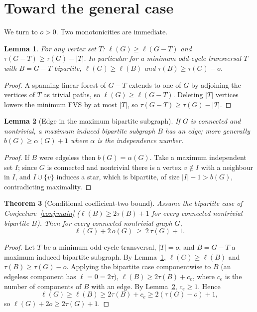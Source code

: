 \documentclass[11pt]{article}
\theoremstyle{plain}
\newtheorem{theorem}{Theorem}[section]
\newtheorem{lemma}[theorem]{Lemma}
\theoremstyle{definition}
\newcommand{\FVS}{\tau}
\newcommand{\OCT}{o}
\newcommand{\lf}{\ell}
\begin{document}
\section{Toward the general case}\label{sec:general}

We turn to $\OCT>0$. Two monotonicities are immediate.

\begin{lemma}\label{lem:mono}
For any vertex set $T$: $\lf(G)\ge\lf(G-T)$ and $\FVS(G-T)\ge\FVS(G)-|T|$. In
particular for a minimum odd-cycle transversal $T$ with $B=G-T$ bipartite,
$\lf(G)\ge\lf(B)$ and $\FVS(B)\ge\FVS(G)-\OCT$.
\end{lemma}

\begin{proof}
A spanning linear forest of $G-T$ extends to one of $G$ by adjoining the vertices
of $T$ as trivial paths, so $\lf(G)\ge\lf(G-T)$. Deleting $|T|$ vertices lowers
the minimum FVS by at most $|T|$, so $\FVS(G-T)\ge\FVS(G)-|T|$.
\end{proof}

\begin{lemma}[Edge in the maximum bipartite subgraph]\label{lem:edge}
If $G$ is connected and nontrivial, a maximum induced bipartite subgraph
$B$ has an edge; more generally $b(G)\ge\alpha(G)+1$ where $\alpha$ is the
independence number.
\end{lemma}

\begin{proof}
If $B$ were edgeless then $b(G)=\alpha(G)$. Take a maximum independent set $I$;
since $G$ is connected and nontrivial there is a vertex $v\notin I$ with a
neighbour in $I$, and $I\cup\{v\}$ induces a star, which is bipartite, of size
$|I|+1>b(G)$, contradicting maximality.
\end{proof}

\begin{theorem}[Conditional coefficient-two bound]\label{thm:B5}
Assume the bipartite case of Conjecture~\ref{conj:main}
($\lf(B)\ge2\FVS(B)+1$ for every connected nontrivial bipartite $B$). Then for
every connected nontrivial graph $G$,
\[
\lf(G)+2\,\OCT(G)\ \ge\ 2\,\FVS(G)+1 .
\]
\end{theorem}

\begin{proof}
Let $T$ be a minimum odd-cycle transversal, $|T|=\OCT$, and $B=G-T$ a maximum
induced bipartite subgraph. By Lemma~\ref{lem:mono}, $\lf(G)\ge\lf(B)$ and
$\FVS(B)\ge\FVS(G)-\OCT$. Applying the bipartite case componentwise to $B$ (an
edgeless component has $\lf=0=2\FVS$),
$\lf(B)\ge2\FVS(B)+c_e$, where $c_e$ is the number of components of $B$ with an
edge. By Lemma~\ref{lem:edge}, $c_e\ge1$. Hence
\[
\lf(G)\ge\lf(B)\ge2\FVS(B)+c_e\ge2(\FVS(G)-\OCT)+1,
\]
so $\lf(G)+2\OCT\ge2\FVS(G)+1$.
\end{proof}
\end{document}
